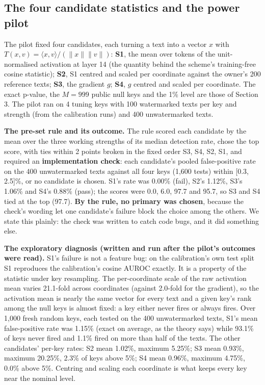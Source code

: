 \documentclass[11pt,letterpaper]{article}
\begin{document}
\hypertarget{the-four-candidate-statistics-and-the-power-pilot}{%
\subsection{The four candidate statistics and the power pilot}\label{the-four-candidate-statistics-and-the-power-pilot}}

The pilot fixed four candidates, each turning a text into a vector \(x\) with \(T(x, v) = \langle x, v \rangle / (\lVert x \rVert \lVert v \rVert)\): \textbf{S1}, the mean over tokens of the unit-normalised activation at layer 14 (the quantity behind the scheme's training-free cosine statistic); \textbf{S2}, S1 centred and scaled per coordinate against the owner's 200 reference texts; \textbf{S3}, the gradient \(g\); \textbf{S4}, \(g\) centred and scaled per coordinate. The exact p-value, the \(M = 999\) public null keys and the 1\% level are those of Section 3. The pilot ran on 4 tuning keys with 100 watermarked texts per key and strength (from the calibration runs) and 400 unwatermarked texts.

\textbf{The pre-set rule and its outcome.} The rule scored each candidate by the mean over the three working strengths of its median detection rate, chose the top score, with ties within 2 points broken in the fixed order S3, S4, S2, S1, and required an \textbf{implementation check}: each candidate's pooled false-positive rate on the 400 unwatermarked texts against all four keys (1,600 tests) within {[}0.3, 2.5{]}\%, or no candidate is chosen. S1's rate was 0.00\% (fail), S2's 1.12\%, S3's 1.06\% and S4's 0.88\% (pass); the scores were 0.0, 6.0, 97.7 and 95.7, so S3 and S4 tied at the top (97.7). \textbf{By the rule, no primary was chosen}, because the check's wording let one candidate's failure block the choice among the others. We state this plainly: the check was written to catch code bugs, and it did something else.

\textbf{The exploratory diagnosis (written and run after the pilot's outcomes were read).} S1's failure is not a feature bug: on the calibration's own test split S1 reproduces the calibration's cosine AUROC exactly. It is a property of the statistic under key resampling. The per-coordinate scale of the raw activation mean varies 21.1-fold across coordinates (against 2.0-fold for the gradient), so the activation mean is nearly the same vector for every text and a given key's rank among the null keys is almost fixed: a key either never fires or always fires. Over 1,000 fresh random keys, each tested on the 400 unwatermarked texts, S1's mean false-positive rate was 1.15\% (exact on average, as the theory says) while 93.1\% of keys never fired and 1.1\% fired on more than half of the texts. The other candidates' per-key rates: S2 mean 1.02\%, maximum 5.25\%; S3 mean 0.93\%, maximum 20.25\%, 2.3\% of keys above 5\%; S4 mean 0.96\%, maximum 4.75\%, 0.0\% above 5\%. Centring and scaling each coordinate is what keeps every key near the nominal level.
\end{document}
